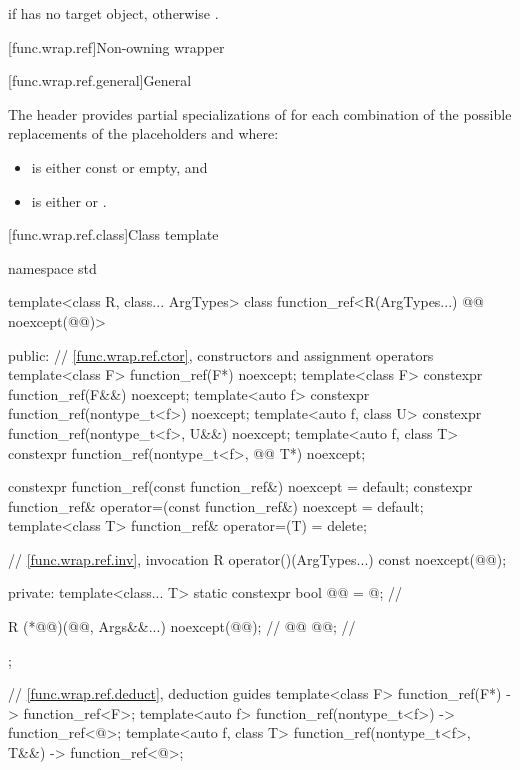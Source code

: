 \begin{itemdescr}
\pnum
\returns
{} if  has no target object, otherwise .
\end{itemdescr}

[func.wrap.ref]{Non-owning wrapper}

[func.wrap.ref.general]{General}

\pnum
The header provides partial specializations of 
for each combination of the possible replacements of
the placeholders \cv{} and  where:

\begin{itemize}
\item \cv{} is either const or empty, and
\item {} is either  or .
\end{itemize}

[func.wrap.ref.class]{Class template }

%
\begin{codeblock}
namespace std {
  template<class R, class... ArgTypes>
  class function_ref<R(ArgTypes...) @\cv{}@ noexcept(@@)> {
  public:
    // \ref{func.wrap.ref.ctor}, constructors and assignment operators
    template<class F> function_ref(F*) noexcept;
    template<class F> constexpr function_ref(F&&) noexcept;
    template<auto f> constexpr function_ref(nontype_t<f>) noexcept;
    template<auto f, class U> constexpr function_ref(nontype_t<f>, U&&) noexcept;
    template<auto f, class T> constexpr function_ref(nontype_t<f>, @\cv{}@ T*) noexcept;

    constexpr function_ref(const function_ref&) noexcept = default;
    constexpr function_ref& operator=(const function_ref&) noexcept = default;
    template<class T> function_ref& operator=(T) = delete;

    // \ref{func.wrap.ref.inv}, invocation
    R operator()(ArgTypes...) const noexcept(@@);

  private:
    template<class... T>
      static constexpr bool @@ = @\seebelownc@;     // \expos

    R (*@@)(@@, Args&&...) noexcept(@@);  // \expos
    @@ @@;                               // \expos
  };

  // \ref{func.wrap.ref.deduct}, deduction guides
  template<class F>
    function_ref(F*) -> function_ref<F>;
  template<auto f>
    function_ref(nontype_t<f>) -> function_ref<@\seebelow@>;
  template<auto f, class T>
    function_ref(nontype_t<f>, T&&) -> function_ref<@\seebelow@>;
}
\end{codeblock}

